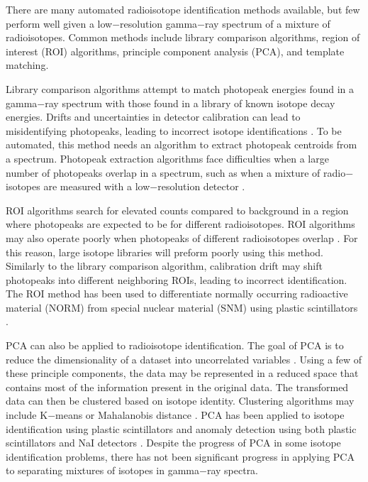 \documentclass[tocnosub,noragright,centerchapter,12pt,fullpage]{uiucecethesis09}
\begin{document}
There are many automated radioisotope identification methods available, but few perform well given a low$-$resolution gamma$-$ray spectrum of a mixture of radioisotopes. Common methods include library comparison algorithms, region of interest (ROI) algorithms, principle component analysis (PCA), and template matching.

Library comparison algorithms attempt to match photopeak energies found in a gamma$-$ray spectrum with those found in a library of known isotope decay energies. Drifts and uncertainties in detector calibration can lead to misidentifying photopeaks, leading to incorrect isotope identifications \cite{burr2009}. To be automated, this method needs an algorithm to extract photopeak centroids from a spectrum. Photopeak extraction algorithms face difficulties when a large number of photopeaks overlap in a spectrum, such as when a mixture of radio$-$isotopes are measured with a low$-$resolution detector \cite{xiong2015}.

ROI algorithms search for elevated counts compared to background in a region where photopeaks are expected to be for different radioisotopes. ROI algorithms may also operate poorly when photopeaks of different radioisotopes overlap \cite{burr2009}. For this reason, large isotope libraries will preform poorly using this method. Similarly to the library comparison algorithm, calibration drift may shift photopeaks into different neighboring ROIs, leading to incorrect identification. The ROI method has been used to differentiate normally occurring radioactive material (NORM) from special nuclear material (SNM) using plastic scintillators \cite{Ely2006}.

PCA can also be applied to radioisotope identification. The goal of PCA is to reduce the dimensionality of a dataset into uncorrelated variables \cite{Jolliffe2002}. Using a few of these principle components, the data may be represented in a reduced space that contains most of the information present in the original data. The transformed data can then be clustered based on isotope identity. Clustering algorithms may include K$-$means or Mahalanobis distance \cite{Kanungo2002, Kumari2012}. PCA has been applied to isotope identification using plastic scintillators \cite{Boardman2012} and anomaly detection using both plastic scintillators and NaI detectors \cite{runkle2006b}. Despite the progress of PCA in some isotope identification problems, there has not been significant progress in applying PCA to separating mixtures of isotopes in gamma$-$ray spectra.
\end{document}

